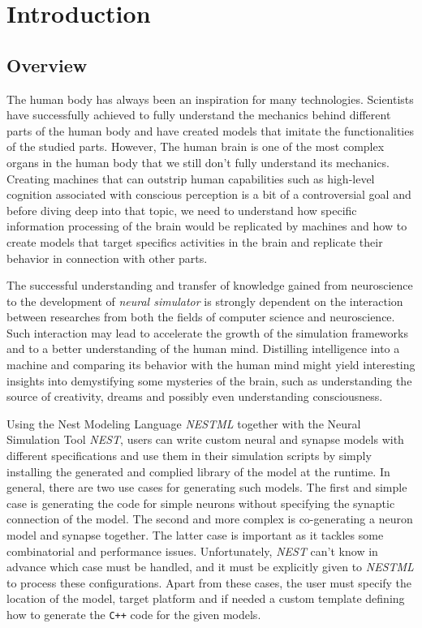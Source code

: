 \chapter{Introduction}

\section{Overview}
The human body has always been an inspiration for many technologies. Scientists have successfully achieved to fully understand the mechanics behind different parts of the human body and have created models that imitate the functionalities of the studied parts. However, The human brain is one of the most complex organs in the human body \citep{nolte2002human} that we still don’t fully understand its mechanics. Creating machines that can outstrip human capabilities such as high-level cognition associated with conscious perception is a bit of a controversial goal and before diving deep into that topic, we need to understand how specific information processing of the brain would be replicated by machines and how to create models that target specifics activities in the brain and replicate their behavior in connection with other parts.

The successful understanding and transfer of knowledge gained from neuroscience to the development of \emph{neural simulator} is strongly dependent on the interaction between researches from both the fields of computer science and neuroscience. Such interaction may lead to accelerate the growth of the simulation frameworks and to a better understanding of the human mind. Distilling intelligence into a machine and comparing its behavior with the human mind might yield interesting insights into demystifying some mysteries of the brain, such as understanding the source of creativity, dreams and possibly even understanding consciousness.

Using the Nest Modeling Language \emph{NESTML} together with the Neural Simulation Tool \emph{NEST}, users can write custom neural and synapse models with different specifications and use them in their simulation scripts by simply installing the generated and complied library of the model at the runtime. In general, there are two use cases for generating such models. The first and simple case is generating the code for simple neurons without specifying the synaptic connection of the model. The second and more complex is co-generating a neuron model and synapse together. The latter case is important as it tackles some combinatorial and performance issues. Unfortunately, \emph{NEST} can't know in advance which case must be handled, and it must be explicitly given to \emph{NESTML} to process these configurations. Apart from these cases, the user must specify the location of the model, target platform and if needed a custom template defining how to generate the \texttt{C++} code for the given models.

